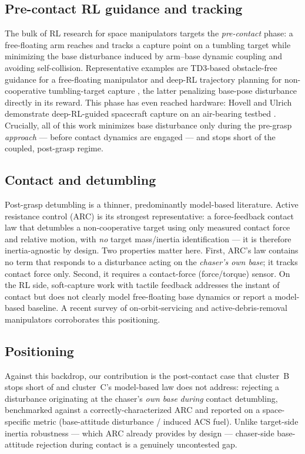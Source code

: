 \documentclass[conference]{IEEEtran}
\begin{document}
\subsection{Pre-contact RL guidance and tracking}
The bulk of RL research for space manipulators targets the \emph{pre-contact} phase: a free-floating
arm reaches and tracks a capture point on a tumbling target while minimizing the base disturbance
induced by arm--base dynamic coupling and avoiding self-collision. Representative examples are
TD3-based obstacle-free guidance for a free-floating manipulator \cite{guidance2510} and deep-RL
trajectory planning for non-cooperative tumbling-target capture \cite{wei2025robotica}, the latter
penalizing base-pose disturbance directly in its reward. This phase has even reached hardware: Hovell
and Ulrich demonstrate deep-RL-guided spacecraft capture on an air-bearing testbed
\cite{hovell2021lab}. Crucially, all of this work minimizes base disturbance only during the
pre-grasp \emph{approach} --- before contact dynamics are engaged --- and stops short of the coupled,
post-grasp regime.

\subsection{Contact and detumbling}
Post-grasp detumbling is a thinner, predominantly model-based literature. Active resistance control
(ARC) \cite{activeresist2025} is its strongest representative: a force-feedback contact law that
detumbles a non-cooperative target using only measured contact force and relative motion, with
\emph{no} target mass/inertia identification --- it is therefore inertia-agnostic by design. Two
properties matter here. First, ARC's law contains no term that responds to a disturbance acting on
the \emph{chaser's own base}; it tracks contact force only. Second, it requires a contact-force
(force/torque) sensor. On the RL side, soft-capture work with tactile feedback \cite{softcapture2409}
addresses the instant of contact but does not clearly model free-floating base dynamics or report a
model-based baseline. A recent survey of on-orbit-servicing and active-debris-removal manipulators
\cite{review2024} corroborates this positioning.

\subsection{Positioning}
Against this backdrop, our contribution is the post-contact case that cluster~B stops short of and
cluster~C's model-based law does not address: rejecting a disturbance originating at the chaser's
\emph{own base} \emph{during} contact detumbling, benchmarked against a correctly-characterized ARC
and reported on a space-specific metric (base-attitude disturbance / induced ACS fuel). Unlike
target-side inertia robustness --- which ARC already provides by design --- chaser-side base-attitude
rejection during contact is a genuinely uncontested gap.
\end{document}
